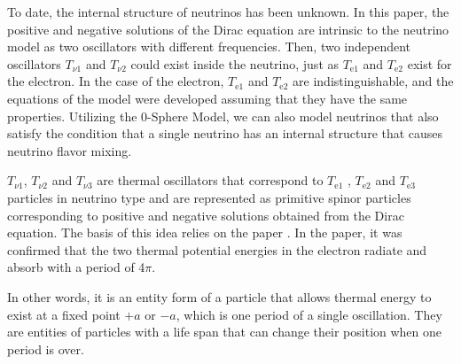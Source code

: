 \documentclass[%
 reprint,
 amsmath,amssymb,
 aps,
]{revtex4-1}
\numberwithin{equation}{section}%
\begin{document}


To date, the internal structure of neutrinos has been unknown. In this paper, the positive and negative solutions of the Dirac equation are intrinsic to the neutrino model as two oscillators with different frequencies. Then, two independent oscillators $T_{\nu \mathrm{1}}$ and $T_{\nu \mathrm{2}}$ could exist inside the neutrino, just as $T_{\mathrm{e1}}$ and $T_{\mathrm{e2}}$ exist for the electron. In the case of the electron, $T_{\mathrm{e1}}$ and $T_{\mathrm{e2}}$ are indistinguishable, and the equations of the model were developed assuming that they have the same properties. Utilizing the 0-Sphere Model, we can also model neutrinos that also satisfy the condition that a single neutrino has an internal structure that causes neutrino flavor mixing.



$T_{\nu \mathrm{1}}$, $T_{\nu \mathrm{2}}$ and $T_{\nu \mathrm{3}}$ are thermal oscillators that correspond to $T_{\mathrm{e1}}$ , $T_{\mathrm{e2}}$ and $T_{\mathrm{e3}}$ particles in neutrino type and are represented as primitive spinor particles corresponding to positive and negative solutions obtained from the Dirac equation. The basis of this idea relies on the paper \cite{Hanamura1}. In the paper, it was confirmed that the two thermal potential energies in the electron radiate and absorb with a period of 4$\pi$. 

In other words, it is an entity form of a particle that allows thermal energy to exist at a fixed point $+a$ or $-a$, which is one period of a single oscillation. They are entities of particles with a life span that can change their position when one period is over.
\end{document}
